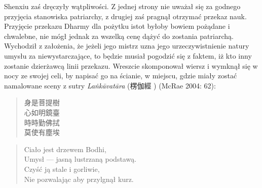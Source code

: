 Shenxiu zaś dręczyły wątpliwości. Z jednej strony nie uważał się za godnego przyjęcia stanowiska patriarchy, z drugiej zaś pragnął otrzymać przekaz nauk.
Przyjęcie przekazu Dharmy dla pożytku istot byłoby bowiem pożądane i chwalebne, nie mógł jednak za wszelką cenę dążyć do zostania patriarchą.
Wychodził z założenia, że jeżeli jego mistrz uzna jego urzeczywistnienie natury umysłu za niewystarczające, to będzie musiał pogodzić się z faktem, iż kto inny zostanie dzierżawcą linii przekazu.
Wreszcie skomponował wiersz i wymknął się w nocy ze swojej celi, by napisać go na ścianie, w miejscu, gdzie miały zostać namalowane sceny z sutry \textit{La\.nkāvatāra} (楞伽經 ) (McRae 2004: 62):

\vspace*{6pt}
\begin{minipage}[t]{0.4\textwidth}
\begin{verse}
身是菩提樹\\
心如明鏡臺\\
時時勤佛拭\\
莫使有塵埃
\end{verse}
\end{minipage}
\begin{minipage}[t]{0.6\textwidth}
\itshape
\begin{verse}
Ciało jest drzewem Bodhi,\\
Umysł --- jasną lustrzaną podstawą.\\
Czyść ją stale i gorliwie,\\
Nie pozwalając aby przylgnął kurz.\fnm
\end{verse}
\end{minipage}
\label{ShenxiuVerse}
\vspace*{1em}

